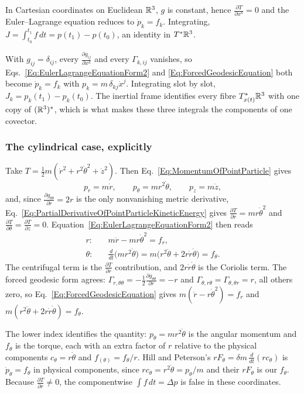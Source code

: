 \begin{proposition}\label{prop:impulse-momentum}
In Cartesian coordinates on Euclidean $\mathbb{R}^3$, $g$ is constant, hence
$\frac{\partial T}{\partial x^k}=0$ and the Euler--Lagrange equation reduces to
$\dot p_k=f_k$. Integrating,
$J=\int_{t_0}^{t_1}f\,dt=p(t_1)-p(t_0)$, an identity in $T^*\mathbb{R}^3$.
\end{proposition}

\noindent With $g_{ij}=\delta_{ij}$, every
$\frac{\partial g_{ij}}{\partial x^k}$ and every $\Gamma_{k,ij}$ vanishes, so
Eqs.~\ref{Eq:EulerLagrangeEquationForm2} and \ref{Eq:ForcedGeodesicEquation}
both become $\dot p_k=f_k$ with $p_k=m\,\delta_{kj}\dot x^j$. Integrating
slot by slot, $J_k=p_k(t_1)-p_k(t_0)$. The inertial frame identifies every
fibre $T^*_{x(t)}\mathbb{R}^3$ with one copy of $(\mathbb{R}^3)^*$, which is what makes
these three integrals the components of one covector.

\subsubsection*{The cylindrical case, explicitly}
Take $T=\tfrac12m(\dot r^2+r^2\dot\theta^2+\dot z^2)$. Then
Eq.~\ref{Eq:MomentumOfPointParticle} gives
\[
 p_r=m\dot r,\qquad p_\theta=mr^2\dot\theta,\qquad p_z=m\dot z,
\]
and, since $\frac{\partial g_{\theta\theta}}{\partial r}=2r$ is the only
nonvanishing metric derivative,
Eq.~\ref{Eq:PartialDerivativeOfPointParticleKineticEnergy} gives
$\frac{\partial T}{\partial r}=mr\dot\theta^2$ and
$\frac{\partial T}{\partial\theta}=\frac{\partial T}{\partial z}=0$.
Equation~\ref{Eq:EulerLagrangeEquationForm2} then reads
\[
\begin{aligned}
 r:&\quad m\ddot r-mr\dot\theta^2=f_r,\\
 \theta:&\quad \frac{d}{dt}\bigl(mr^2\dot\theta\bigr)
   =m\bigl(r^2\ddot\theta+2r\dot r\dot\theta\bigr)=f_\theta .
\end{aligned}
\]
The centrifugal term is the $\frac{\partial T}{\partial r}$ contribution, and
$2r\dot r\dot\theta$ is the Coriolis term. The forced geodesic form agrees:
$\Gamma_{r,\theta\theta}=-\tfrac12\frac{\partial g_{\theta\theta}}{\partial r}=-r$
and $\Gamma_{\theta,r\theta}=\Gamma_{\theta,\theta r}=r$, all others zero, so
Eq.~\ref{Eq:ForcedGeodesicEquation} gives
$m(\ddot r-r\dot\theta^2)=f_r$ and
$m(r^2\ddot\theta+2r\dot r\dot\theta)=f_\theta$.

The lower index identifies the quantity: $p_\theta=mr^2\dot\theta$ is the
angular momentum and $f_\theta$ is the torque, each with an extra factor of
$r$ relative to the physical components $c_\theta=r\dot\theta$ and
$f_{(\theta)}=f_\theta/r$. Hill and Peterson's
$rF_\theta=\delta m\,\tfrac{d}{dt}(rc_\theta)$ \cite[Eq.~7.5]{hillpeterson}
is $\dot p_\theta=f_\theta$ in physical components, since
$rc_\theta=r^2\dot\theta=p_\theta/m$ and their $rF_\theta$ is our $f_\theta$.
Because $\frac{\partial T}{\partial r}\neq0$, the componentwise
$\int f\,dt=\Delta p$ is false in these coordinates.

